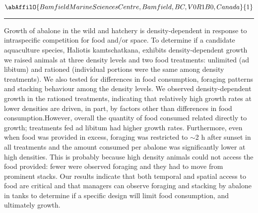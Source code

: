 \begin{minipage}{\linewidth}\begin{center}\begin{minipage}{\linewidth}
   \vspace{2 mm} \begin{center}
    \vspace{2 mm}\begin{center}
  
  $\abAffilO{Bamfield Marine Sciences Centre, Bamfield, BC, V0R 1B0, Canada}{1}$

  \end{center}
  \vspace{2 mm}
  \end{center}\end{minipage}\end{center}
  \begin{center}\rule{0.70\linewidth}{0.5 pt}\end{center}
  \begin{minipage}{\linewidth}
\noindent Growth of abalone in the wild and hatchery is density-dependent in response to intraspecific competition for food and/or space. To determine if a candidate aquaculture species, Haliotis kamtschatkana, exhibits density-dependent growth we raised animals at three density levels and two food treatments: unlimited (ad libitum) and rationed (individual portions were the same among density treatments). We also tested for differences in food consumption, foraging patterns and stacking behaviour among the density levels. We observed density-dependent growth in the rationed treatments, indicating that relatively high growth rates at lower densities are driven, in part, by factors other than differences in food consumption.However, overall the quantity of food consumed related directly to growth; treatments fed ad libitum had higher growth rates. Furthermore, even when food was provided in excess, foraging was restricted to $\sim$2 h after sunset in all treatments and the amount consumed per abalone was significantly lower at high densities. This is probably because high density animals could not access the food provided: fewer were observed foraging and they had to move from prominent stacks. Our results indicate that both temporal and spatial access to food are critical and that managers can observe foraging and stacking by abalone in tanks to determine if a specific design will limit food consumption, and ultimately growth.
\end{minipage}\end{minipage}
